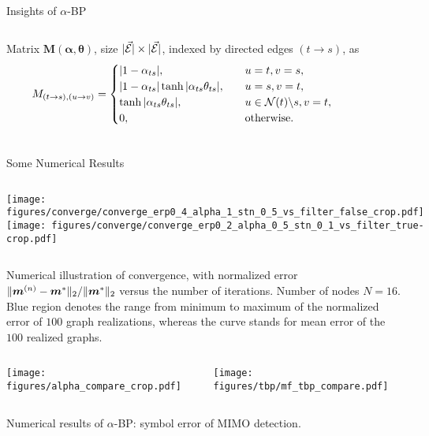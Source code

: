 \begin{frame}[label=current]{Insights of $\alpha$-BP}
{\begin{columns}
      Matrix $\bm{M}(\bm{\alpha}, \bm{\theta})$, size $| \vec{\mathcal{E}} | \times | \vec{\mathcal{E}} |$, indexed by directed edges $(t\rightarrow s)$, as
      \begin{align*}
        M_{(t\rightarrow s), (u \rightarrow v)} =
        \begin{cases}
          |  1 - \alpha_{ts} |, &\quad u=t, v=s, \\
          |  1 - \alpha_{ts} | \tanh | \alpha_{ts} \theta_{ts} |, & \quad u = s, v =t, \\
          \tanh| \alpha_{ts} \theta_{ts} |, & \quad u \in \mathcal{N}(t)\backslash s, v = t, \\
          0, & \quad \mathrm{otherwise}.
        \end{cases}
      \end{align*}
    \end{columns}
  }
\end{frame}
\begin{frame}[label=current]{Some Numerical Results}
  
    \graphicspath{{../source/chapter3/}}
    \begin{columns}
      \texttt{[image: figures/converge/converge\_erp0\_4\_alpha\_1\_stn\_0\_5\_vs\_filter\_false\_crop.pdf]}
      \texttt{[image: figures/converge/converge\_erp0\_2\_alpha\_0\_5\_stn\_0\_1\_vs\_filter\_true-crop.pdf]}
    \end{columns}
    \centering
    {\tiny Numerical illustration of convergence, with normalized error ${\| \bm{m}^{(n)}-\bm{m}^{\ast} \|_{2}}/{\| \bm{m}^{\ast} \|_{2}}$ versus the number of iterations. Number of nodes $N=16$. Blue region denotes the range from minimum to maximum of the normalized error of $100$ graph realizations, whereas the curve stands for mean error of the $100$ realized graphs. }
    \vskip -0.2cm
    \begin{columns}
      \begin{center}
        \texttt{[image: figures/alpha\_compare\_crop.pdf]}
      \end{center}
      \centering
      \texttt{[image: figures/tbp/mf\_tbp\_compare.pdf]}
    \end{columns}
    \centering
    {\tiny Numerical results of $\alpha$-BP: symbol error of MIMO detection.}

\end{frame}


